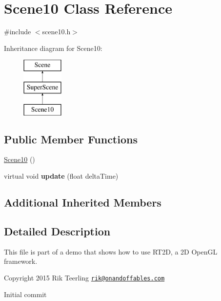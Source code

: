 \hypertarget{class_scene10}{}\section{Scene10 Class Reference}
\label{class_scene10}


{\ttfamily \#include $<$scene10.\+h$>$}

Inheritance diagram for Scene10\+:\begin{figure}[H]
\begin{center}
\leavevmode
\includegraphics[height=3.000000cm]{class_scene10}
\end{center}
\end{figure}
\subsection*{Public Member Functions}
\begin{DoxyCompactItemize}
\item 
\hyperlink{class_scene10_adce71ede75c32dd246ec0d491dec531b}{Scene10} ()
\item 
\mbox{\label{class_scene10_a8ce8f4d45625a7704bb8493317efc631}} 
virtual void {\bfseries update} (float delta\+Time)
\end{DoxyCompactItemize}
\subsection*{Additional Inherited Members}


\subsection{Detailed Description}
This file is part of a demo that shows how to use R\+T2D, a 2D Open\+GL framework.


\begin{DoxyItemize}
\item Copyright 2015 Rik Teerling \href{mailto:rik@onandoffables.com}{\tt rik@onandoffables.\+com}
\begin{DoxyItemize}
\item Initial commit 
\end{DoxyItemize}
\end{DoxyItemize}

